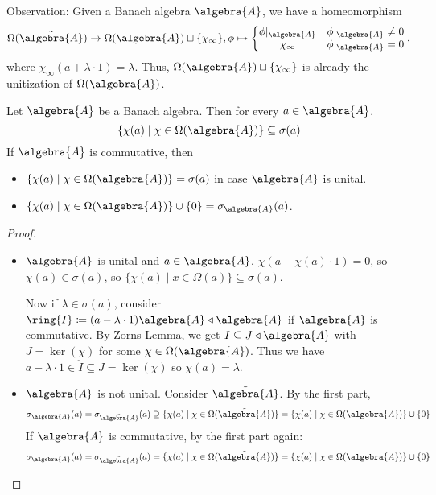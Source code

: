 \documentclass[a4paper]{article}
\begin{document}
Observation: Given a Banach algebra $\algebra{A}$, we have a homeomorphism 
\begin{equation*}
	\Omega(\tilde{\algebra{A}}) \to \Omega(\algebra{A}) \sqcup \{ \chi_\infty\}, \phi \mapsto \left\{  \begin{matrix}
		\phi|_\algebra{A} & \phi|_{\algebra{A}} \neq 0\\
		\chi_\infty & \phi|_\algebra{A} = 0
	\end{matrix}\right. \text{,}
\end{equation*}
where $\chi_\infty(a + \lambda \cdot 1) = \lambda$. Thus, $\Omega(\algebra{A}) \sqcup \{\chi_\infty\}$ is already the unitization of $\Omega(\algebra{A})$. 

\begin{theorem}
	Let $\algebra{A}$ be a Banach algebra. Then for every $a \in \algebra{A}$.
	\begin{equation*}
		\{ \chi (a) \mid \chi \in \Omega(\algebra{A}) \} \subseteq \sigma(a)
	\end{equation*}
	If $\algebra{A}$ is commutative, then
	\begin{itemize}
		\item $\{ \chi(a) \mid \chi \in \Omega(\algebra{A})\} = \sigma(a)$ in case $\algebra{A}$ is unital.
		\item $\{ \chi(a) \mid \chi \in \Omega(\algebra{A})\} \cup \{0\} = \sigma_{\algebra{A}}(a)$.
	\end{itemize}
\end{theorem}

\begin{proof}~
	\begin{itemize}
		\item $\algebra{A}$ is unital and $a \in \algebra{A}$. $\chi(a - \chi(a) \cdot 1) = 0$, so $\chi(a) \in \sigma(a)$, so $\{ \chi(a) \mid x \in \Omega(a) \}  \subseteq \sigma(a)$.
		
		Now if $\lambda \in \sigma(a)$, consider $\ring{I} \coloneq (a - \lambda \cdot 1) \algebra{A} \triangleleft \algebra{A}$ if $\algebra{A}$ is commutative.
		By Zorns Lemma, we get $I \subseteq J \triangleleft \algebra{A}$ with $J = \ker(\chi)$ for some $\chi \in \Omega(\algebra{A})$. Thus we have $a - \lambda \cdot 1 \in \ring{I} \subseteq J = \ker(\chi)$ so $\chi(a) = \lambda$.

		\item $\algebra{A}$ is not unital. Consider $\tilde{\algebra{A}}$. By the first part,
		\begin{equation*}
			\sigma_\algebra{A}(a) = \sigma_{\tilde{\algebra{A}}}(a) \supseteq \{\chi(a) \mid \chi \in \Omega(\tilde{\algebra{A}}) \} = \{\chi(a) \mid \chi \in \Omega(\algebra{A}) \} \cup \{0\}
		\end{equation*}
		If $\algebra{A}$ is commutative, by the first part again: 
		\begin{equation*}
			\sigma_\algebra{A}(a) = \sigma_{\tilde{\algebra{A}}}(a) = \{\chi(a) \mid \chi \in \Omega(\tilde{\algebra{A}})\} = \{\chi(a) \mid \chi \in \Omega(\algebra{A}) \} \cup \{0\}
		\end{equation*}
	\end{itemize}
\end{proof}
\end{document}
